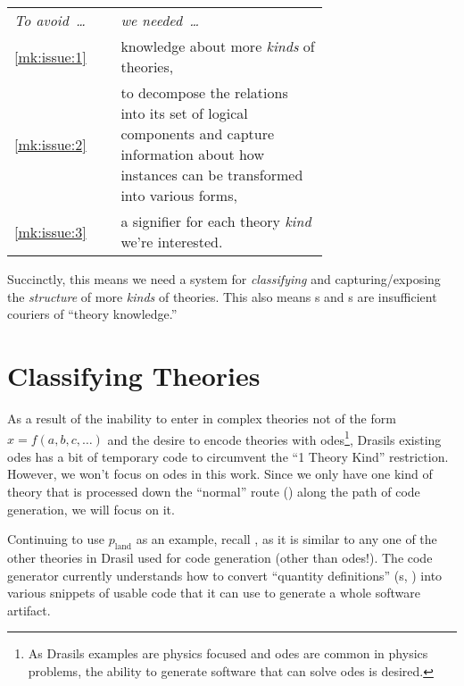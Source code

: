 \begin{longtable}[c]{>{\raggedright}p{0.2\linewidth}>{\raggedright\arraybackslash}p{0.5\linewidth}}
    \textit{To avoid~\ldots{}} & \textit{we needed~\ldots{}}                                 \\
    \ref{mk:issue:1}           & knowledge about more \textit{kinds} of theories,            \\
    \ref{mk:issue:2}           & to decompose the relations into its set of
    logical components and capture information about how instances can be
    transformed into various forms,                                                          \\
    \ref{mk:issue:3}           & a signifier for each theory \textit{kind} we're interested. \\
\end{longtable}

Succinctly, this means we need a system for \textit{classifying} and
capturing/exposing the \textit{structure} of more \textit{kinds} of theories.
This also means \RelationConcept{}s and \Relation{}s are insufficient couriers
of ``theory knowledge.''

\section{Classifying Theories}
\label{chap:modelkinds:sec:classifying-theories}

As a result of the inability to enter in complex theories not of the form \(x =
f(a, b, c, \ldots{})\) and the desire to encode theories with
\acsp{ode}\footnote{As Drasils examples are physics focused and \acsp{ode} are
    common in physics problems, the ability to generate software that can solve
    \acsp{ode} is desired.}, Drasils existing \acsp{ode} has a bit of temporary code
to circumvent the ``1 Theory Kind'' restriction. However, we won't focus on
\acsp{ode} in this work. Since we only have one kind of theory that is processed
down the ``normal'' route (\relToQD{}) along the path of code generation, we
will focus on it.

Continuing to use \(p_\text{land}\) as an example, recall
, as it is similar to any one of the other
theories in Drasil used for code generation (other than \acsp{ode}!). The code
generator currently understands how to convert ``quantity definitions''
(\QDefinition{}s, ) into various snippets of
usable code that it can use to generate a whole software artifact.

